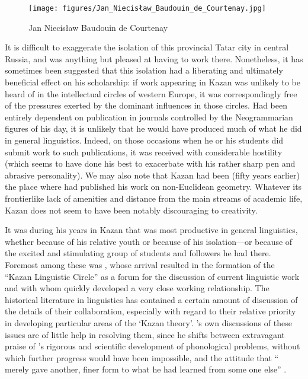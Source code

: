 \begin{wrapfigure}{l}{.4\textwidth}
  \texttt{[image: figures/Jan\_Niecisław\_Baudouin\_de\_Courtenay.jpg]}
  \caption{Jan Niecisław Baudouin de Courtenay}
  \label{fig:ch.kazan_baudouin}
\end{wrapfigure}
It is difficult to exaggerate the isolation of this provincial Tatar
city in central Russia, and {\Baudouin} was anything but pleased at
having to work there. Nonetheless, it has sometimes been suggested
that this isolation had a liberating and ultimately beneficial effect
on his scholarship: if work appearing in Kazan was unlikely to be
heard of in the intellectual circles of western Europe, it was
correspondingly free of the pressures exerted by the dominant
influences in those circles. Had {\Baudouin} been entirely dependent on
publication in journals controlled by the Neogrammarian figures of his
day, it is unlikely that he would have produced much of what he did in
general linguistics. Indeed, on those occasions when he or his
students did submit work to such publications, it was received with
considerable hostility (which {\Baudouin} seems to have done his best to
exacerbate with his rather sharp pen and abrasive personality). We may
also note that Kazan had been (fifty years earlier) the place where
 had published his work on non-Euclidean
geometry. Whatever its frontierlike lack of amenities and distance
from the main streams of academic life, Kazan does not seem to have
been notably discouraging to creativity.

It was during his years in Kazan that {\Baudouin} was most productive in
general linguistics, whether because of his relative youth or because
of his isolation—or because of the excited and stimulating group of
students and followers he had there. Foremost among these was , whose arrival resulted in the formation of the ``Kazan
Linguistic Circle'' as a forum for the discussion of current
linguistic work and with whom {\Baudouin} quickly developed a very close
working relationship. The historical literature in linguistics has
contained a certain amount of discussion of the details of their
collaboration, especially with regard to their relative priority in
developing particular areas of the `Kazan theory'. {\Baudouin}'s own
discussions of these issues are of little help in resolving them,
since he shifts between extravagant praise of {\Kruszewski}'s rigorous
and scientific development of phonological problems, without which
further progress would have been impossible, and the attitude that
``{\Kruszewski} merely gave another, finer form to what he had learned
from some one else'' \citep[150]{baudouin95:attempt}.

